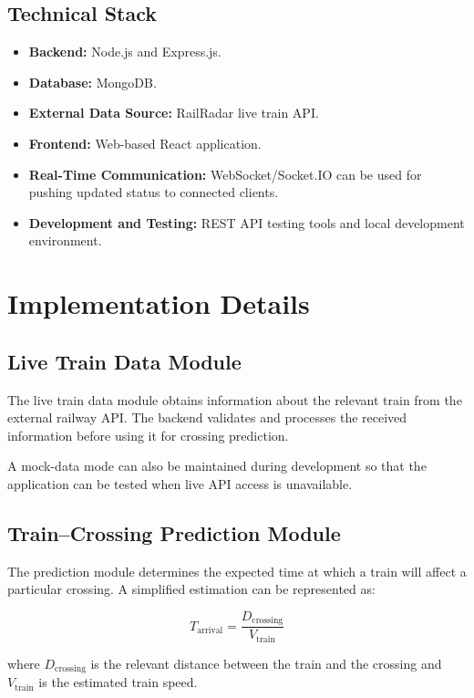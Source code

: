 \documentclass[12pt,a4paper]{report}
\begin{document}
\subsection{Technical Stack}

\begin{itemize}
  \item \textbf{Backend:} Node.js and Express.js.
  \item \textbf{Database:} MongoDB.
  \item \textbf{External Data Source:} RailRadar live train API.
  \item \textbf{Frontend:} Web-based React application.
  \item \textbf{Real-Time Communication:} WebSocket/Socket.IO can be used for
        pushing updated status to connected clients.
  \item \textbf{Development and Testing:} REST API testing tools and local
        development environment.
\end{itemize}

\section{Implementation Details}

\subsection{Live Train Data Module}

The live train data module obtains information about the relevant train from the
external railway API. The backend validates and processes the received information
before using it for crossing prediction.

A mock-data mode can also be maintained during development so that the application
can be tested when live API access is unavailable.

\subsection{Train--Crossing Prediction Module}

The prediction module determines the expected time at which a train will affect a
particular crossing. A simplified estimation can be represented as:

\[
T_{\mathrm{arrival}} =
\frac{D_{\mathrm{crossing}}}{V_{\mathrm{train}}}
\]

where $D_{\mathrm{crossing}}$ is the relevant distance between the train and the
crossing and $V_{\mathrm{train}}$ is the estimated train speed.
\end{document}
